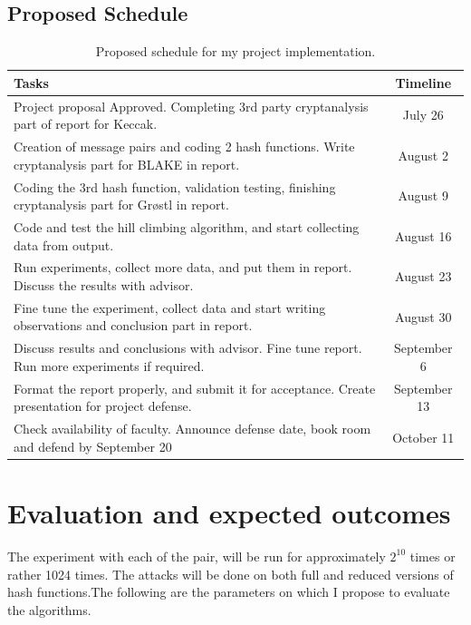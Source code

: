\documentclass[12pt]{artikel3}                  %
\begin{document}
\subsection{Proposed Schedule}
\begin{table}[h]
  \begin{center}
    \begin{tabular}{ | p{12cm} | c | } \hline
      Tasks                                                                                                   & Timeline \\ \hline
      Project proposal Approved. Completing 3rd party cryptanalysis part of report for Keccak.                & July 26 \\ \hline
      Creation of message pairs and coding 2 hash functions. Write cryptanalysis part for BLAKE in report.    & August 2 \\ \hline
      Coding the 3rd hash function, validation testing, finishing cryptanalysis part for Gr{\o}stl in report. & August 9 \\ \hline
      Code and test the hill climbing algorithm, and start collecting data from output.                       & August 16 \\ \hline
      Run experiments, collect more data, and put them in report. Discuss the results with advisor.           & August 23 \\ \hline
      Fine tune the experiment, collect data and start writing observations and conclusion part in report.    & August 30 \\ \hline
      Discuss results and conclusions with advisor. Fine tune report. Run more experiments if required.       & September 6 \\ \hline
      Format the report properly, and submit it for acceptance. Create presentation for project defense.      & September 13 \\ \hline
      Check availability of faculty. Announce defense date, book room and defend by September 20              & October 11 \\ \hline
    \end{tabular}
  \caption{Proposed schedule for my project implementation.}
  \end{center}
\end{table}

\section{Evaluation and expected outcomes}
The experiment with each of the pair, will be run for approximately $2^{10}$ times or rather 1024 times.
The attacks will be done on both full and reduced versions of hash functions.The following are the parameters
on which I propose to evaluate the algorithms. 
\end{document}
